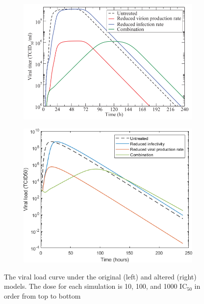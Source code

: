 \documentclass[a4paper,11pt]{article}
\begin{document}
\begin{figure}[ht]
\begin{subfigure}{0.4\textwidth}
    \includegraphics[width=\textwidth]{treatm1000.png}
    \end{subfigure}
    \begin{subfigure}{0.35\textwidth}

    \includegraphics[width=\textwidth]{treat1000.png}
    \end{subfigure}


    \caption{\small The viral load curve under the original (left) and altered (right) models. The dose for each simulation is 10, 100, and 1000 $\mathrm{IC}_{50}$ in order from top to bottom}
    \label{fig:my_label}
\end{figure}
\end{document}
